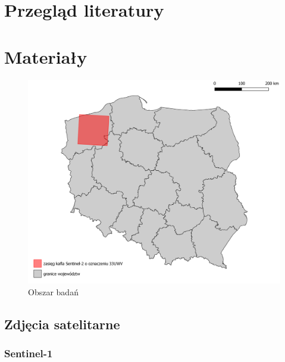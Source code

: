 \documentclass{amuthesis}
\begin{document}
\hypertarget{sec-lit}{%
\chapter{Przegląd literatury}\label{sec-lit}}


\hypertarget{sec-materialy}{%
\chapter{Materiały}\label{sec-materialy}}

\begin{figure}[t]

{\centering \includegraphics[width=1\textwidth,height=\textheight]{figures/sen2_extent.png}

}

\caption{\label{fig-rycina-area}Obszar badań}

\end{figure}

\hypertarget{sec-satellite-imagery}{%
\section{Zdjęcia satelitarne}\label{sec-satellite-imagery}}

\hypertarget{sec-sentinel1}{%
\subsection{Sentinel-1}\label{sec-sentinel1}}
\end{document}

